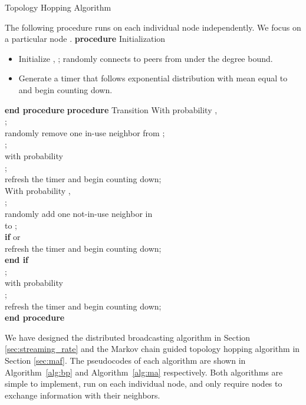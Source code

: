 \documentclass[10pt,conference]{IEEEtran}
\begin{document}
\begin{algorithm}[hbt!]
\caption{Topology Hopping Algorithm}
\label{alg:ma}
\begin{algorithmic}[1]
\STATE The following procedure runs on each individual node independently. We focus on a particular node .
\STATE \textbf{procedure} Initialization
\begin{itemize}
\item Initialize , ; randomly connects to peers from  under the degree bound.
\item Generate a timer that follows exponential distribution with mean equal to  and begin counting down.
\end{itemize}
\STATE \textbf{end procedure}
\STATE {}
\STATE \textbf{procedure} Transition
\STATE With probability ,\\
\STATE ;\\
\STATE randomly remove one in-use neighbor from ;\\
\STATE ;\\
\STATE    with probability\\
       ;\\
\STATE refresh the timer and begin counting down;\\
\STATE With probability ,\\
\STATE ;\\
\STATE randomly add one not-in-use neighbor  in\\
        to ;\\
\STATE \textbf{if}  or \\
\STATE refresh the timer and begin counting down;\\
\STATE \textbf{end if}\\
\STATE ;\\
\STATE    with probability\\
       ;\\
\STATE refresh the timer and begin counting down;\\
\STATE \textbf{end procedure}
\end{algorithmic}
\end{algorithm}

We have designed the distributed broadcasting algorithm in Section
\ref{sec:streaming_rate} and the Markov chain guided topology hopping
algorithm in Section \ref{sec:maf}. The pseudocodes of each algorithm
are shown in Algorithm~\ref{alg:bp} and Algorithm~\ref{alg:ma} respectively.
Both algorithms are simple to implement, run on each individual node,
and only require nodes to exchange information with their neighbors.
\end{document}
